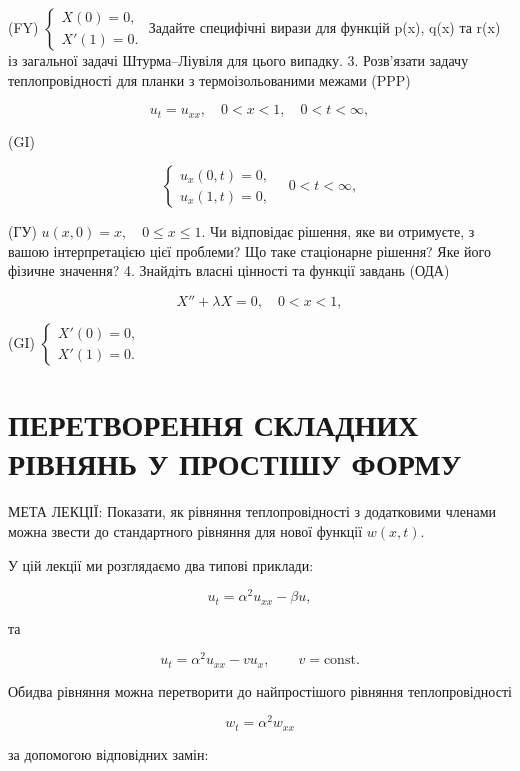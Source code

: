 \documentclass[
  ukrainian,
]{article}
\begin{document}
(FY) \(\begin{cases} X(0) = 0, \\ X'(1) = 0. \end{cases}\) Задайте
специфічні вирази для функцій p(x), q(x) та r(x) із загальної задачі
Штурма--Ліувіля для цього випадку. 3. Розв'язати задачу теплопровідності
для планки з термоізольованими межами (PPP)

\[
u_t = u_{xx}, \quad 0 < x < 1, \quad 0 < t < \infty,
\]

(GI)

\[
\begin{cases} u_x (0, t) = 0, \\ u_x (1, t) = 0, \end{cases} \quad 0 < t < \infty,
\]

(ГУ) \(u(x, 0) = x, \quad 0 \le x \le 1.\) Чи відповідає рішення, яке ви
отримуєте, з вашою інтерпретацією цієї проблеми? Що таке стаціонарне
рішення? Яке його фізичне значення? 4. Знайдіть власні цінності та
функції завдань (ОДА)

\[
X'' + \lambda X = 0, \quad 0 < x < 1,
\]

(GI) \(\begin{cases} X'(0) = 0, \\ X'(1) = 0. \end{cases}\)

\section{ПЕРЕТВОРЕННЯ СКЛАДНИХ РІВНЯНЬ У ПРОСТІШУ
ФОРМУ}\label{ux43fux435ux440ux435ux442ux432ux43eux440ux435ux43dux43dux44f-ux441ux43aux43bux430ux434ux43dux438ux445-ux440ux456ux432ux43dux44fux43dux44c-ux443-ux43fux440ux43eux441ux442ux456ux448ux443-ux444ux43eux440ux43cux443}

МЕТА ЛЕКЦІЇ: Показати, як рівняння теплопровідності з додатковими
членами можна звести до стандартного рівняння для нової функції
\(w(x,t)\).

У цій лекції ми розглядаємо два типові приклади:

\[
u_t = \alpha^2 u_{xx} - \beta u,
\]

та

\[
u_t = \alpha^2 u_{xx} - v u_x, \qquad v=\text{const}.
\]

Обидва рівняння можна перетворити до найпростішого рівняння
теплопровідності

\[
w_t = \alpha^2 w_{xx}
\]

за допомогою відповідних замін:
\end{document}
